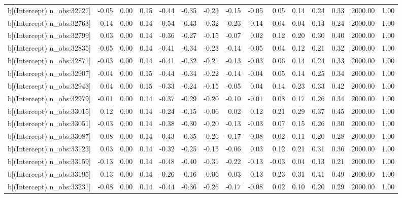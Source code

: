 \begin{table}[ht]
\begin{tabular}{rrrrrrrrrrrrrrr}
  b[(Intercept) n\_obs:32727] & -0.05 & 0.00 & 0.15 & -0.44 & -0.35 & -0.23 & -0.15 & -0.05 & 0.05 & 0.14 & 0.24 & 0.33 & 2000.00 & 1.00 \\ 
  b[(Intercept) n\_obs:32763] & -0.14 & 0.00 & 0.14 & -0.54 & -0.43 & -0.32 & -0.23 & -0.14 & -0.04 & 0.04 & 0.14 & 0.24 & 2000.00 & 1.00 \\ 
  b[(Intercept) n\_obs:32799] & 0.03 & 0.00 & 0.14 & -0.36 & -0.27 & -0.15 & -0.07 & 0.02 & 0.12 & 0.20 & 0.30 & 0.40 & 2000.00 & 1.00 \\ 
  b[(Intercept) n\_obs:32835] & -0.05 & 0.00 & 0.14 & -0.41 & -0.34 & -0.23 & -0.14 & -0.05 & 0.04 & 0.12 & 0.21 & 0.32 & 2000.00 & 1.00 \\ 
  b[(Intercept) n\_obs:32871] & -0.03 & 0.00 & 0.14 & -0.41 & -0.32 & -0.21 & -0.13 & -0.03 & 0.06 & 0.14 & 0.24 & 0.33 & 2000.00 & 1.00 \\ 
  b[(Intercept) n\_obs:32907] & -0.04 & 0.00 & 0.15 & -0.44 & -0.34 & -0.22 & -0.14 & -0.04 & 0.05 & 0.14 & 0.25 & 0.34 & 2000.00 & 1.00 \\ 
  b[(Intercept) n\_obs:32943] & 0.04 & 0.00 & 0.15 & -0.33 & -0.24 & -0.15 & -0.05 & 0.04 & 0.14 & 0.23 & 0.33 & 0.42 & 2000.00 & 1.00 \\ 
  b[(Intercept) n\_obs:32979] & -0.01 & 0.00 & 0.14 & -0.37 & -0.29 & -0.20 & -0.10 & -0.01 & 0.08 & 0.17 & 0.26 & 0.34 & 2000.00 & 1.00 \\ 
  b[(Intercept) n\_obs:33015] & 0.12 & 0.00 & 0.14 & -0.24 & -0.15 & -0.06 & 0.02 & 0.12 & 0.21 & 0.29 & 0.37 & 0.45 & 2000.00 & 1.00 \\ 
  b[(Intercept) n\_obs:33051] & -0.03 & 0.00 & 0.14 & -0.38 & -0.30 & -0.20 & -0.13 & -0.03 & 0.07 & 0.15 & 0.26 & 0.30 & 2000.00 & 1.00 \\ 
  b[(Intercept) n\_obs:33087] & -0.08 & 0.00 & 0.14 & -0.43 & -0.35 & -0.26 & -0.17 & -0.08 & 0.02 & 0.11 & 0.20 & 0.28 & 2000.00 & 1.00 \\ 
  b[(Intercept) n\_obs:33123] & 0.03 & 0.00 & 0.14 & -0.32 & -0.25 & -0.15 & -0.06 & 0.03 & 0.12 & 0.21 & 0.31 & 0.36 & 2000.00 & 1.00 \\ 
  b[(Intercept) n\_obs:33159] & -0.13 & 0.00 & 0.14 & -0.48 & -0.40 & -0.31 & -0.22 & -0.13 & -0.03 & 0.04 & 0.13 & 0.21 & 2000.00 & 1.00 \\ 
  b[(Intercept) n\_obs:33195] & 0.13 & 0.00 & 0.14 & -0.26 & -0.16 & -0.06 & 0.03 & 0.13 & 0.23 & 0.31 & 0.41 & 0.49 & 2000.00 & 1.00 \\ 
  b[(Intercept) n\_obs:33231] & -0.08 & 0.00 & 0.14 & -0.44 & -0.36 & -0.26 & -0.17 & -0.08 & 0.02 & 0.10 & 0.20 & 0.29 & 2000.00 & 1.00 \\ 

\end{tabular}
\end{table}
